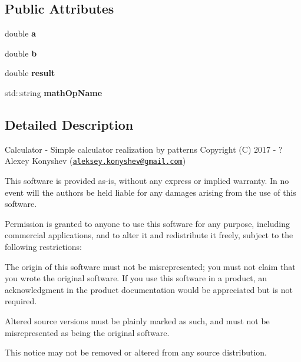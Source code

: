 \subsection*{Public Attributes}
\begin{DoxyCompactItemize}
\item 
\hypertarget{class_math_op_afa40241343dc3c5d550e13c45ec3a958}{}double {\bfseries a}\label{class_math_op_afa40241343dc3c5d550e13c45ec3a958}

\item 
\hypertarget{class_math_op_afff7e10b49bb685057eea3b6cd1cdd90}{}double {\bfseries b}\label{class_math_op_afff7e10b49bb685057eea3b6cd1cdd90}

\item 
\hypertarget{class_math_op_a156f7ed952cbc7b0efe5a53cb3706d88}{}double {\bfseries result}\label{class_math_op_a156f7ed952cbc7b0efe5a53cb3706d88}

\item 
\hypertarget{class_math_op_ae747c21140de4a79fada80575519ca22}{}std\+::string {\bfseries math\+Op\+Name}\label{class_math_op_ae747c21140de4a79fada80575519ca22}

\end{DoxyCompactItemize}


\subsection{Detailed Description}
Calculator -\/ Simple calculator realization by patterns Copyright (C) 2017 -\/ ? Alexey Konyshev (\href{mailto:aleksey.konyshev@gmail.com}{\tt aleksey.\+konyshev@gmail.\+com})

This software is provided \textquotesingle{}as-\/is\textquotesingle{}, without any express or implied warranty. In no event will the authors be held liable for any damages arising from the use of this software.

Permission is granted to anyone to use this software for any purpose, including commercial applications, and to alter it and redistribute it freely, subject to the following restrictions\+:


\begin{DoxyEnumerate}
\item The origin of this software must not be misrepresented; you must not claim that you wrote the original software. If you use this software in a product, an acknowledgment in the product documentation would be appreciated but is not required.
\item Altered source versions must be plainly marked as such, and must not be misrepresented as being the original software.
\item This notice may not be removed or altered from any source distribution. 
\end{DoxyEnumerate}

